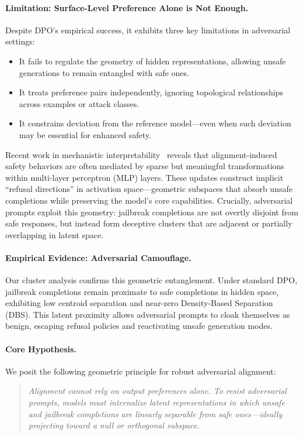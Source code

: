 \paragraph{Limitation: Surface-Level Preference Alone is Not Enough.} Despite DPO’s empirical success, it exhibits three key limitations in adversarial settings:
\begin{itemize}
    \item It fails to regulate the geometry of hidden representations, allowing unsafe generations to remain entangled with safe ones.
    \item It treats preference pairs independently, ignoring topological relationships across examples or attack classes.
    \item It constrains deviation from the reference model—even when such deviation may be essential for enhanced safety.
\end{itemize}

Recent work in mechanistic interpretability~\cite{NEURIPS2024_a9bef53e, wei2023jailbroken} reveals that alignment-induced safety behaviors are often mediated by sparse but meaningful transformations within multi-layer perceptron (MLP) layers. These updates construct implicit “refusal directions” in activation space—geometric subspaces that absorb unsafe completions while preserving the model’s core capabilities. Crucially, adversarial prompts exploit this geometry: jailbreak completions are not overtly disjoint from safe responses, but instead form deceptive clusters that are adjacent or partially overlapping in latent space.

\paragraph{Empirical Evidence: Adversarial Camouflage.}
Our cluster analysis confirms this geometric entanglement. Under standard DPO, jailbreak completions remain proximate to safe completions in hidden space, exhibiting low centroid separation and near-zero Density-Based Separation (DBS). This latent proximity allows adversarial prompts to cloak themselves as benign, escaping refusal policies and reactivating unsafe generation modes.

\paragraph{Core Hypothesis.}
We posit the following geometric principle for robust adversarial alignment:

\begin{quote}
    \textit{Alignment cannot rely on output preferences alone. To resist adversarial prompts, models must internalize latent representations in which unsafe and jailbreak completions are linearly separable from safe ones—ideally projecting toward a null or orthogonal subspace.}
\end{quote}















